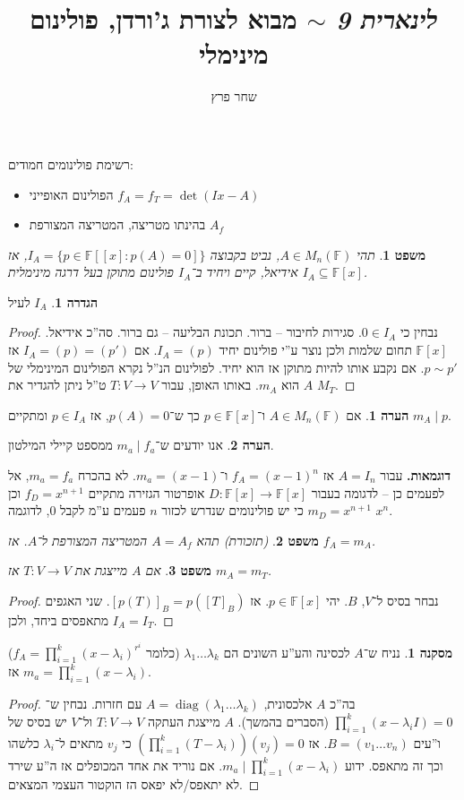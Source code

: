 \documentclass[]{article}
\author{שחר פרץ}
\title{\textit{לינארית 9} $\sim$ מבוא לצורת ג'ורדן, פולינום מינימלי}
\DeclareMathOperator{\diag}    {diag}
\newcommand\F         {\mathbb{F}}
\newcommand\co        {\colon}
\renewcommand\lg      {\lambda}
\newcommand\cl [1]    {\left ( #1 \right )}
\newtheorem{Theorem}{משפט}
\theoremstyle{definition}
\newtheorem{definition}{הגדרה}
\newtheorem{Remark}{הערה}
\newtheorem{Hence}{מסקנה}
\newcommand\theo  [1] {\begin{Theorem}#1\end{Theorem}}
\newcommand\defi  [1] {\begin{definition}#1\end{definition}}
\newcommand\rmark [1] {\begin{Remark}#1\end{Remark}}
\begin{document}
    \maketitle
    רשימת פולינומים חמודים: 
    \begin{itemize}
        \item הפולינום האופייני $f_A = f_T = \det(Ix - A)$
        \item בהינתו מטריצה, המטריצה המצורפת $A_f$
    \end{itemize}
    
    \theo{תהי $A \in M_n(\F)$, נביט בקבוצה $I_A = \{p \in \F[[x] \co p(A) = 0]\}$, אז $I_A \subseteq \F[x]$ אידיאל, קיים ויחיד ב־$I_A$ פולינום מתוקן בעל דרגה מינימלית. }
    \defi{$I_A$ לעיל}
    \begin{proof}
        נבחין כי $0 \in I_A$. סגירות לחיבור – ברור. תכונת הבליעה – גם ברור. סה''כ אידיאל. 
        $\F[x]$ תחום שלמות ולכן נוצר ע''י פולינום יחיד $I_A = (p)$. אם $I_A = (p) = (p')$ אז $p \sim p'$. אם נקבע אותו להיות מתוקן אז הוא יחיד. לפולינום הנ''ל נקרא הפולינום המינימלי של $A$ הוא $m_A$. באותו האופן, עבור $T \co V \to V$ ט''ל ניתן להגדיר את $M_T$. 
    \end{proof}
    
    \rmark{אם $A \in M_n(\F)$ ו־$p \in \F[x]$ כך ש־$p(A) = 0$, אז $p \in I_A$ ומתקיים $m_A \mid p$. }
    
    \rmark{אנו יודעים ש־$m_a \mid f_a$ ממספט קיילי המילטון. }
    
    \textbf{דוגמאות. }עבור $A = I_n$ אז $f_A = (x - 1)^{n}$ ו־$m_a = (x - 1)$. לא בהכרח $m_a = f_a$, אל לפעמים כן – לדגומה בעבור $D \co \F[x] \to \F[x]$ אופרטור הגזירה מתקיים $f_D = x^{n + 1}$ וכן $m_D = x^{n + 1}$ כי יש פולינומים שנדרש לכזור $n$ פעמים ע''מ לקבל $0$, לדוגמה $x^{n}$. 
    
    \theo{(תזכורת) תהא $A =A_f$ המטריצה המצורפת ל־$A$. אז $f_A = m_A$.}
    \theo{אם $A$ מייצגת את $T \co V \to V$ אז $m_A = m_T$.}
    \begin{proof}
        נבחר בסיס ל־$V$, $B$. יהי $p \in \F[x]$. אז $[p(T)]_B = p([T]_B)$. שני האגפים מתאפסים ביחד, ולכן $I_A = I_T$. 
    \end{proof}
    \begin{Hence}
        נניח ש־$A$ לכסינה והע''ע השונים הם $\lg_1 \dots \lg_k$ (כלומר $f_A = \prod_{i = 1}^{k}(x - \lg_i)^{r^i}$) אז $m_a = \prod_{i = 1}^{k}(x - \lg_i)$. 
    \end{Hence}
    \begin{proof}
        בה''כ $A$ אלכסונית, $A = \diag(\lg_1 \dots \lg_k)$ עם חזרות. נבחין ש־$\prod_{i = 1}^{k} (x - \lg_iI) = 0$ (הסברים בהמשך). $A$ מייצגת העתקה $T \co V \to V$ ול־$V$ יש בסיס של ו''עים $B = (v_1 \dots v_n)$.  אז $\cl{\prod_{i = 1}^{k}(T - \lg_i)}(v_j) = 0$ כי $v_j$ מתאים ל־$\lg_i$ כלשהו וכך זה מתאפס. ידוע $m_a \mid \prod_{i = 1}^{k}(x - \lg_i)$. אם נוריד את אחד המכופלים אז ה''ע שירד לא יתאפס/לא יפאס הז הוקטור העצמי המצאים. 
    \end{proof}
    
\end{document}
